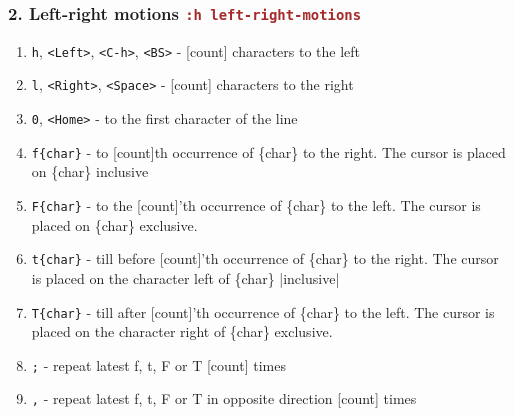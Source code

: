 \documentclass{beamer}
\newcommand{\vimcommand}[1]{\texttt{\textcolor{brown}{#1}}}
\newcommand{\vimhelp}[1]{\vimcommand{:h #1}}
\newcommand{\vimkey}[1]{\textless{}#1\textgreater{}}
\begin{document}
\begin{frame}
    \frametitle{2. Left-right motions \vimhelp{left-right-motions}}
    \begin{enumerate}
      \item \texttt{h}, \texttt{\vimkey{Left}}, \texttt{\vimkey{C-h}}, \texttt{\vimkey{BS}} - [count] characters to the left
        \item \texttt{l}, \texttt{\vimkey{Right}}, \texttt{\textless{}Space\textgreater{}}           - [count] characters to the right
        \item \texttt{0}, \texttt{\textless{}Home\textgreater{}}                              - to the first character of the line
        \item \texttt{f\{char\}}                                       - to [count]th occurrence of \{char\} to the right. The cursor is placed on \{char\} inclusive
        \item \texttt{F\{char\}}                                       - to the [count]'th occurrence of \{char\} to the left. The cursor is placed on \{char\} exclusive.
        \item \texttt{t\{char\}}                                       - till before [count]'th occurrence of \{char\} to the right.  The cursor is placed on the character left of \{char\} |inclusive|
        \item \texttt{T\{char\}}                                       - till after [count]'th occurrence of \{char\} to the left.  The cursor is placed on the character right of \{char\} exclusive.
        \item \texttt{;}                                               - repeat latest f, t, F or T [count] times
        \item \texttt{,}                                               - repeat latest f, t, F or T in opposite direction [count] times
    \end{enumerate}
\end{frame}
\end{document}
